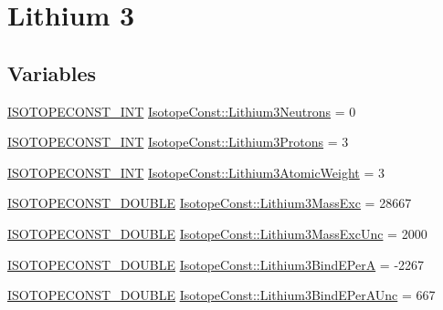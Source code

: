 \hypertarget{group___isotope_const-_lithium-_li3}{}\section{Lithium 3}
\label{group___isotope_const-_lithium-_li3}
\subsection*{Variables}
\begin{DoxyCompactItemize}
\item 
\mbox{\hyperlink{group___isotope_const-_macros_ga5f18360b3e99483a35c32d789e62621c}{I\+S\+O\+T\+O\+P\+E\+C\+O\+N\+S\+T\+\_\+\+I\+NT}} \mbox{\hyperlink{group___isotope_const-_lithium-_li3_ga65f2b9e8099b1b60f604befb2979ba21}{Isotope\+Const\+::\+Lithium3\+Neutrons}} = 0
\item 
\mbox{\hyperlink{group___isotope_const-_macros_ga5f18360b3e99483a35c32d789e62621c}{I\+S\+O\+T\+O\+P\+E\+C\+O\+N\+S\+T\+\_\+\+I\+NT}} \mbox{\hyperlink{group___isotope_const-_lithium-_li3_gaa02b6b7e8aaa4a8a44fbc10b84e3760d}{Isotope\+Const\+::\+Lithium3\+Protons}} = 3
\item 
\mbox{\hyperlink{group___isotope_const-_macros_ga5f18360b3e99483a35c32d789e62621c}{I\+S\+O\+T\+O\+P\+E\+C\+O\+N\+S\+T\+\_\+\+I\+NT}} \mbox{\hyperlink{group___isotope_const-_lithium-_li3_gac483fca9f737bcb2aee26995c6aa3a17}{Isotope\+Const\+::\+Lithium3\+Atomic\+Weight}} = 3
\item 
\mbox{\hyperlink{group___isotope_const-_macros_ga8f45a7272ce02c0b4c65c44636ed719a}{I\+S\+O\+T\+O\+P\+E\+C\+O\+N\+S\+T\+\_\+\+D\+O\+U\+B\+LE}} \mbox{\hyperlink{group___isotope_const-_lithium-_li3_ga8d35c645d7a3b07c88af3596f92a0f4d}{Isotope\+Const\+::\+Lithium3\+Mass\+Exc}} = 28667
\item 
\mbox{\hyperlink{group___isotope_const-_macros_ga8f45a7272ce02c0b4c65c44636ed719a}{I\+S\+O\+T\+O\+P\+E\+C\+O\+N\+S\+T\+\_\+\+D\+O\+U\+B\+LE}} \mbox{\hyperlink{group___isotope_const-_lithium-_li3_ga1f8f6b1de6f31a5d5f33adbf8ddd00c4}{Isotope\+Const\+::\+Lithium3\+Mass\+Exc\+Unc}} = 2000
\item 
\mbox{\hyperlink{group___isotope_const-_macros_ga8f45a7272ce02c0b4c65c44636ed719a}{I\+S\+O\+T\+O\+P\+E\+C\+O\+N\+S\+T\+\_\+\+D\+O\+U\+B\+LE}} \mbox{\hyperlink{group___isotope_const-_lithium-_li3_gab11a3b4db8858be96c21388210bf0b93}{Isotope\+Const\+::\+Lithium3\+Bind\+E\+PerA}} = -\/2267
\item 
\mbox{\hyperlink{group___isotope_const-_macros_ga8f45a7272ce02c0b4c65c44636ed719a}{I\+S\+O\+T\+O\+P\+E\+C\+O\+N\+S\+T\+\_\+\+D\+O\+U\+B\+LE}} \mbox{\hyperlink{group___isotope_const-_lithium-_li3_gaff1ce83f35fe2cc155665db0ed3b777e}{Isotope\+Const\+::\+Lithium3\+Bind\+E\+Per\+A\+Unc}} = 667

\end{DoxyCompactItemize}

